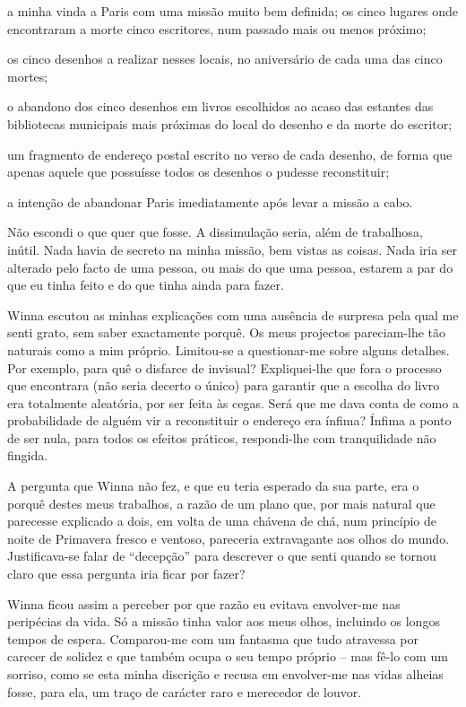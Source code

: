 a minha vinda a Paris com uma missão muito bem definida; os cinco
lugares onde encontraram a morte cinco escritores, num passado mais ou menos próximo;

os cinco desenhos a realizar nesses locais, no aniversário de cada uma
das cinco mortes;

o abandono dos cinco desenhos em livros escolhidos ao acaso das estantes
das bibliotecas municipais mais próximas do local do desenho e da morte
do escritor;

um fragmento de endereço postal escrito no verso de cada desenho, de
forma que apenas aquele que possuísse todos os desenhos o pudesse
reconstituir;

a intenção de abandonar Paris imediatamente após levar a missão a cabo.

Não escondi o que quer que fosse. A dissimulação seria, além de
trabalhosa, inútil. Nada havia de secreto na minha missão, bem vistas as
coisas. Nada iria ser alterado pelo facto de uma pessoa, ou mais do que
uma pessoa, estarem a par do
que eu tinha feito e do que tinha ainda para fazer.

Winna escutou as minhas explicações com uma ausência de surpresa pela
qual me senti grato, sem saber exactamente porquê. Os meus projectos
pareciam-lhe tão naturais como a mim próprio. Limitou-se a questionar-me
sobre alguns detalhes. Por exemplo, para quê o disfarce de invisual?
Expliquei-lhe que fora o processo que encontrara (não seria decerto o único) para
garantir que a escolha do livro era totalmente aleatória, por ser feita
às cegas. Será que me dava conta de como a probabilidade de alguém vir a
reconstituir o endereço era ínfima? Ínfima a ponto de ser nula, para
todos os efeitos práticos, respondi-lhe com tranquilidade não fingida.

A pergunta que Winna não fez, e que eu teria esperado da sua parte, era
o porquê destes meus trabalhos, a razão de um plano que, por mais
natural que parecesse explicado a dois, em volta de uma chávena de chá,
num princípio de noite de Primavera fresco e ventoso, pareceria
extravagante aos olhos do mundo. Justificava-se falar de ``decepção''
para descrever o que senti quando se tornou claro que essa pergunta iria
ficar por fazer?

Winna ficou assim a perceber por que razão eu evitava envolver-me nas
peripécias da vida. Só a missão tinha valor aos meus olhos, incluindo os
longos tempos de espera. Comparou-me com um fantasma que tudo
atravessa por carecer de solidez e que também ocupa o seu tempo próprio
-- mas fê-lo com um sorriso, como se esta minha discrição e recusa em
envolver-me nas vidas alheias fosse, para ela, um traço de carácter raro
e merecedor de louvor.

